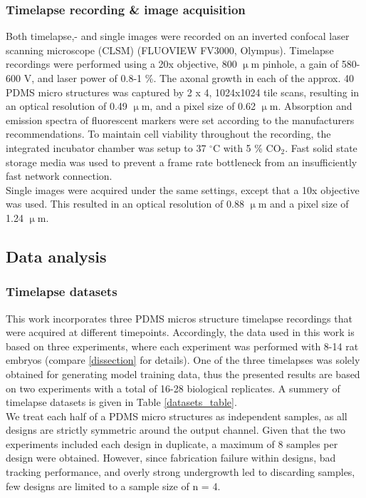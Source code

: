 \subsubsection{Timelapse recording \& image acquisition}
\label{imagingsettings}
Both timelapse,- and single images were recorded on an inverted confocal laser
scanning microscope (CLSM) (FLUOVIEW FV3000, Olympus). Timelapse recordings were
performed using a 20x objective, 800 $\upmu$m pinhole, a gain of 580-600 V, and
laser power of 0.8-1 \%. The axonal growth in each of the approx. 40 PDMS micro
structures was captured by 2 x 4, 1024x1024 tile scans, resulting in an optical
resolution of 0.49 $\upmu$m, and a pixel size of 0.62 $\upmu$m. Absorption and
emission spectra of fluorescent markers were set according to the manufacturers
recommendations. To maintain cell viability throughout the recording, the
integrated incubator chamber was setup to 37 $^{\circ}$C with 5 \% CO$_{2}$.
Fast solid state storage media was used to prevent a frame rate bottleneck from
an insufficiently fast network connection. \\
Single images were acquired under the same settings, except that a 10x objective
was used. This resulted in an optical resolution of 0.88 $\upmu$m and a pixel
size of 1.24 $\upmu$m. 

\subsection{Data analysis}
\subsubsection{Timelapse datasets}
This work incorporates three PDMS micros structure timelapse recordings that
were acquired at different timepoints. Accordingly, the data used in this work
is based on three experiments, where each experiment was performed with 8-14 rat
embryos (compare \ref{dissection} for details). One of the three timelapses was
solely obtained for generating model training data, thus the presented results
are based on two experiments with a total of 16-28 biological replicates. A
summery of timelapse datasets is given in Table \ref{datasets_table}. \\

We treat each half of a PDMS micro structures as independent samples, as all
designs are strictly symmetric around the output channel. Given that the two
experiments included each design in duplicate, a maximum of 8 samples per design
were obtained. However, since fabrication failure within designs, bad tracking
performance, and overly strong undergrowth led to discarding samples, few
designs are limited to a sample size of n = 4.

